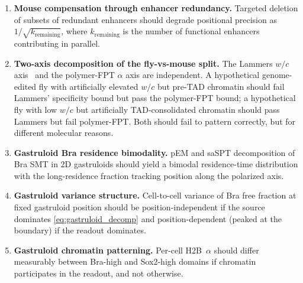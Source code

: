 \documentclass[11pt]{article}
\begin{document}
\begin{enumerate}
  \item \textbf{Mouse compensation through enhancer redundancy.} Targeted
        deletion of subsets of redundant enhancers should degrade positional
        precision as~$1/\sqrt{k_{\mathrm{remaining}}}$, where
        $k_{\mathrm{remaining}}$ is the number of functional enhancers
        contributing in parallel.

  \item \textbf{Two-axis decomposition of the fly-vs-mouse split.} The
        Lammers $w/c$ axis~\cite{Lammers2023} and the polymer-FPT $\alpha$
        axis are independent. A hypothetical genome-edited fly with
        artificially elevated $w/c$ but pre-TAD chromatin should fail
        Lammers' specificity bound but pass the polymer-FPT bound; a
        hypothetical fly with low $w/c$ but artificially TAD-consolidated
        chromatin should pass Lammers but fail polymer-FPT. Both should
        fail to pattern correctly, but for different molecular reasons.

  \item \textbf{Gastruloid Bra residence bimodality.} pEM and saSPT
        decomposition of Bra SMT in 2D gastruloids should yield a bimodal
        residence-time distribution with the long-residence fraction
        tracking position along the polarized axis.

  \item \textbf{Gastruloid variance structure.} Cell-to-cell variance of
        Bra free fraction at fixed gastruloid position should be
        position-independent if the source dominates
        \eqref{eq:gastruloid_decomp} and position-dependent (peaked at the
        boundary) if the readout dominates.

  \item \textbf{Gastruloid chromatin patterning.} Per-cell H2B~$\alpha$
        should differ measurably between Bra-high and Sox2-high domains if
        chromatin participates in the readout, and not otherwise.


\end{enumerate}
\end{document}
